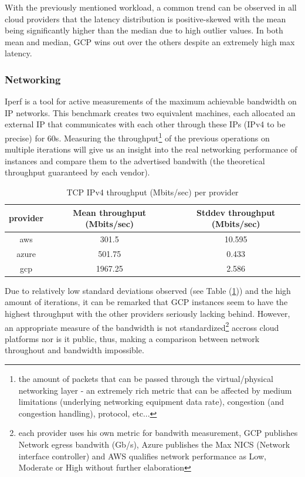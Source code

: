 \documentclass[11pt]{article}
\begin{document}
With the previously mentioned workload, a common trend can be observed in all cloud providers that the latency distribution is positive-skewed with the mean being significantly higher than the median due to high outlier values. In both mean and median, GCP wins out over the others despite an extremely high max latency. 

\subsubsection{Networking}


\vspace{-5mm}\hspace{5mm} Iperf is a tool for active measurements of the maximum achievable bandwidth on IP networks. 
This benchmark creates two equivalent machines, each allocated an external IP that communicates with each other through these IPs (IPv4 to be precise) for 60s. 
Measuring the throughput\footnote{the amount of packets that can be passed through the virtual/physical networking layer - an extremely rich metric that can be affected by medium limitations (underlying networking equipment data rate), congestion (and congestion handling), protocol, etc...} of the previous operations on multiple iterations will give us an insight into the real networking performance of instances and compare them to the advertised bandwith (the theoretical throughput guaranteed by each vendor).

\begin{table}[h]
    \centering
    \begin{tabular}{|c|c|c|}
    \hline
    \textbf{provider} & \textbf{Mean throughput (Mbits/sec)} & \textbf{Stddev throughput (Mbits/sec)} \\ \hline
    aws               & 301.5                                & 10.595                            \\ \hline
    azure             & 501.75                               & 0.433                           \\ \hline
    gcp               & 1967.25                              & 2.586                            \\ \hline
    \end{tabular}
    \caption{TCP IPv4 throughput (Mbits/sec) per provider}
    \label{tab:bench_iperf}
\end{table}

Due to relatively low standard deviations observed (see Table (\ref{tab:bench_iperf})) and the high amount of iterations, it can be remarked that GCP instances seem to have the highest throughput with the other providers seriously lacking behind. However, an appropriate measure of the bandwidth is not standardized\footnote{each provider uses his own metric for bandwith measurement, GCP publishes Network egress bandwith (Gb/s), Azure publishes the Max NICS (Network interface controller) and AWS qualifies network performance as Low, Moderate or High without further elaboration} accross cloud platforms nor is it public, thus, making a comparison between network throughout and bandwidth impossible.
\end{document}
